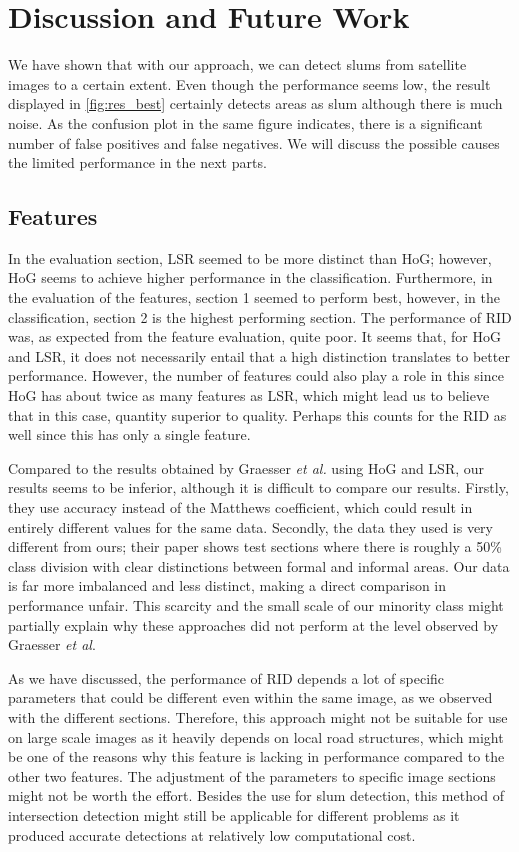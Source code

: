 \section{Discussion and Future Work}
We have shown that with our approach, we can detect slums from satellite images to a certain extent. Even though the performance seems low, the result displayed in \ref{fig:res_best} certainly detects areas as slum although there is much noise. As the confusion plot in the same figure indicates, there is a significant number of false positives and false negatives. We will discuss the possible causes the limited performance in the next parts.

\subsection{Features}
In the evaluation section, LSR seemed to be more distinct than HoG; however, HoG seems to achieve higher performance in the classification. Furthermore, in the evaluation of the features, section 1 seemed to perform best, however, in the classification, section 2 is the highest performing section. The performance of RID was, as expected from the feature evaluation, quite poor. It seems that, for HoG and LSR, it does not necessarily entail that a high distinction translates to better performance. However, the number of features could also play a role in this since HoG has about twice as many features as LSR, which might lead us to believe that in this case, quantity superior to quality. Perhaps this counts for the RID as well since this has only a single feature.

Compared to the results obtained by Graesser \textit{et al.} using HoG and LSR, our results seems to be inferior, although it is difficult to compare our results. Firstly, they use accuracy instead of the Matthews coefficient, which could result in entirely different values for the same data. Secondly, the data they used is very different from ours; their paper shows test sections where there is roughly a 50\% class division with clear distinctions between formal and informal areas. Our data is far more imbalanced and less distinct, making a direct comparison in performance unfair. This scarcity and the small scale of our minority class might partially explain why these approaches did not perform at the level observed by Graesser \textit{et al}.

As we have discussed, the performance of RID depends a lot of specific parameters that could be different even within the same image, as we observed with the different sections. Therefore, this approach might not be suitable for use on large scale images as it heavily depends on local road structures, which might be one of the reasons why this feature is lacking in performance compared to the other two features. The adjustment of the parameters to specific image sections might not be worth the effort. Besides the use for slum detection, this method of intersection detection might still be applicable for different problems as it produced accurate detections at relatively low computational cost.


